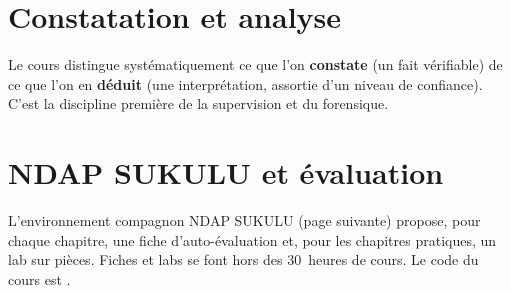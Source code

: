 \section*{Constatation et analyse}

Le cours distingue systématiquement ce que l'on \textbf{constate} (un fait
vérifiable) de ce que l'on en \textbf{déduit} (une interprétation, assortie
d'un niveau de confiance). C'est la discipline première de la supervision et
du forensique.

\section*{NDAP SUKULU et évaluation}

L'environnement compagnon NDAP SUKULU (page suivante) propose, pour chaque
chapitre, une fiche d'auto-évaluation et, pour les chapitres pratiques, un
lab sur pièces. Fiches et labs se font hors des 30~heures de cours. Le code
du cours est \textbf{\codeUE}.
